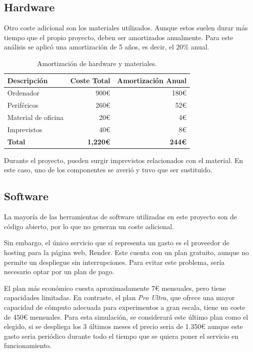 \subsection{Hardware}

Otro coste adicional son los materiales utilizados. Aunque estos suelen durar más tiempo que el propio proyecto, deben ser amortizados anualmente. Para este análisis se aplicó una amortización de 5 años, es decir, el 20\% anual.

\begin{table}[H]
\centering
\begin{tabular}{lrr}
\toprule
Descripción & Coste Total & Amortización Anual \\ 
\midrule
Ordenador & 900€ & 180€ \\
Periféricos & 260€ & 52€ \\
Material de oficina & 20€ & 4€ \\
Imprevistos & 40€ & 8€ \\
\textbf{Total} & \textbf{1,220€} & \textbf{244€} \\ 
\bottomrule
\end{tabular}
\caption{Amortización de hardware y materiales.}
\end{table}

Durante el proyecto, pueden surgir imprevistos relacionados con el material. En este caso, uno de los componentes se averió y tuvo que ser sustituido.

\subsection{Software}

La mayoría de las herramientas de software utilizadas en este proyecto son de código abierto, por lo que no generan un coste adicional.

Sin embargo, el único servicio que sí representa un gasto es el proveedor de hosting para la página web, Render. Este cuenta con un plan gratuito, aunque no permite un despliegue sin interrupciones. Para evitar este problema, sería necesario optar por un plan de pago. 

El plan más económico cuesta aproximadamente 7€ mensuales, pero tiene capacidades limitadas. En contraste, el plan \textit{Pro Ultra}, que ofrece una mayor capacidad de cómputo adecuada para experimentos a gran escala, tiene un coste de 450€ mensuales. Para esta simulación, se considerará este último plan como el elegido, si se despliega los 3 últimos meses el precio seria de 1.350€ aunque este gasto seria periódico durante todo el tiempo que se quiera poner el servicio en funcionamiento.

